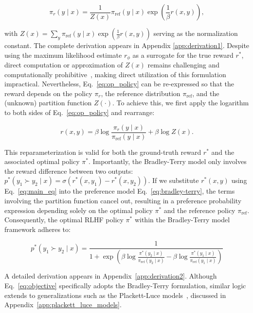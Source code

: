 \begin{equation}\label{eq:op_policy}
    \pi_r(y\mid x) = \frac{1}{Z(x)}\pi_\text{ref}(y\mid x)\exp\left(\frac{1}{\beta}r(x, y)\right),
\end{equation}

with $Z(x) =\sum_{y}\pi_\text{ref}(y\mid x)\exp\left(\frac{1}{\beta}r(x, y)\right)$ serving as the normalization constant. The complete derivation appears in Appendix \ref{app:derivation1}. Despite using the maximum likelihood estimate $r_{\phi}$ as a surrogate for the true reward $r^*$, direct computation or approximation of $Z(x)$ remains challenging and computationally prohibitive~\citep{korbak2022reinforcement, go2023aligning}, making direct utilization of this formulation impractical. Nevertheless, Eq.~\ref{eq:op_policy} can be re-expressed so that the reward depends on the policy $\pi_r$, the reference distribution $\pi_\text{ref}$, and the (unknown) partition function $Z(\cdot)$. To achieve this, we first apply the logarithm to both sides of Eq.~\ref{eq:op_policy} and rearrange:

\begin{equation}\label{eq:main_eq}
    r(x,y) =\beta \log \frac{\pi_r(y\mid x)}{\pi_\text{ref}(y\mid x)} + \beta \log Z(x).
\end{equation}

This reparameterization is valid for both the ground-truth reward $r^*$ and the associated optimal policy $\pi^*$. Importantly, the Bradley-Terry model only involves the reward difference between two outputs: ${p^*(y_1 \succ y_2 \mid x) = \sigma(r^*(x, y_1) - r^*(x, y_2))}$. If we substitute $r^*(x,y)$ using Eq.~\ref{eq:main_eq} into the preference model Eq.~\ref{eq:bradley-terry}, the terms involving the partition function cancel out, resulting in a preference probability expression depending solely on the optimal policy $\pi^*$ and the reference policy $\pi_\text{ref}$. Consequently, the optimal RLHF policy $\pi^*$ within the Bradley-Terry model framework adheres to:

\begin{equation}\label{eq:objective}
    p^*(y_1\succ y_2 \mid x)=\frac{1}{1 + \exp\left(\beta \log \frac{\pi^*(y_2\mid x)}{\pi_\text{ref}(y_2\mid x)} - \beta \log \frac{\pi^*(y_1\mid x)}{\pi_\text{ref}(y_1\mid x)}\right)}
\end{equation}

A detailed derivation appears in Appendix~\ref{app:derivation2}. Although Eq.~\ref{eq:objective} specifically adopts the Bradley-Terry formulation, similar logic extends to generalizations such as the Plackett-Luce models~\citep{plackett1975analysis, luce2012individual}, discussed in Appendix~\ref{app:plackett_luce_models}.

